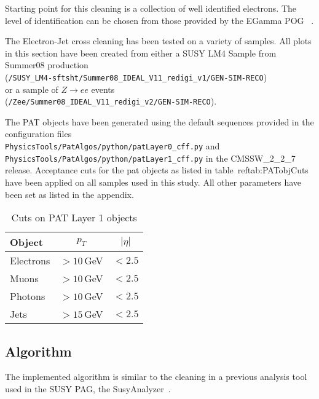 \documentclass{cmspaper}
\begin{document}
Starting point for this cleaning is a collection of well identified electrons.
The level of identification can be chosen from those provided by the EGamma POG
~\cite{elecID}.

The Electron-Jet cross cleaning has been tested on a variety of samples. All
plots in this section have been created from either a SUSY LM4 Sample from
Summer08 production\\
(\texttt{/SUSY\_LM4-sftsht/Summer08\_IDEAL\_V11\_redigi\_v1/GEN-SIM-RECO})\\
or a sample of
$Z\rightarrow ee$ events \\(\texttt{/Zee/Summer08\_IDEAL\_V11\_redigi\_v2/GEN-SIM-RECO}).

The PAT objects have been generated using the default sequences provided in the
configuration files\\
\texttt{PhysicsTools/PatAlgos/python/patLayer0\_cff.py} and\\
\texttt{PhysicsTools/PatAlgos/python/patLayer1\_cff.py} in the CMSSW\_2\_2\_7
release. Acceptance cuts for the pat objects as listed in
table~ref{tab:PATobjCuts} have been applied on all samples used in this study.
All other parameters have been set as listed in the appendix.

\begin{table}[h]
\caption{Cuts on PAT Layer 1 objects}
\begin{center}
\begin{tabular}{l|c|c}
\textbf{Object} & \textbf{$p_T$} & \textbf{$|\eta|$} \\ \hline
    Electrons & $>10$\,GeV & $<2.5$  \\\hline
    Muons     & $>10$\,GeV & $<2.5$  \\\hline
    Photons   & $>10$\,GeV & $<2.5$  \\\hline
    Jets      & $>15$\,GeV & $<2.5$
\end{tabular}
\end{center}
\label{tab:PATobjCuts}
\end{table}

\subsection{Algorithm}
The implemented algorithm is similar to the cleaning in a previous analysis
tool used in the SUSY PAG, the SusyAnalyzer~\cite{SusyAnalyzer}.
\end{document}
